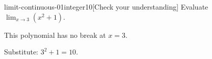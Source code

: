 \begin{bgcheck}{limit-continuous-01}{integer}{10}[Check your understanding]
Evaluate \(\lim_{x\to3}(x^2+1)\).
\begin{bghint}
This polynomial has no break at \(x=3\).
\end{bghint}
\begin{bgreveal}
Substitute: \(3^2+1=10\).
\end{bgreveal}
\end{bgcheck}
